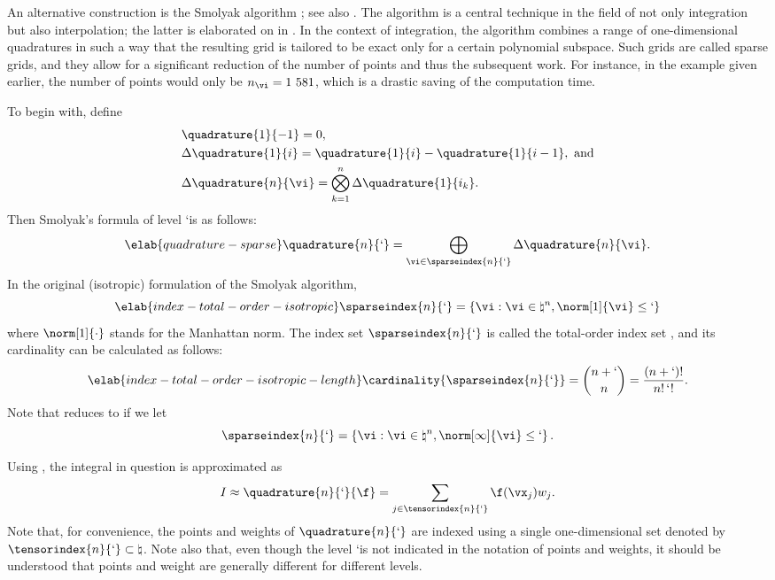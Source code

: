 An alternative construction is the Smolyak algorithm \cite{smolyak1963}; see
also \cite{klimke2006, eldred2008, heiss2008, maitre2010}. The algorithm is a
central technique in the field of not only integration but also interpolation;
the latter is elaborated on in . In the context of
integration, the algorithm combines a range of one-dimensional quadratures in
such a way that the resulting grid is tailored to be exact only for a certain
polynomial subspace. Such grids are called sparse grids, and they allow for a
significant reduction of the number of points and thus the subsequent work. For
instance, in the example given earlier, the number of points would only be
$n_{\vi} = 1~581$, which is a drastic saving of the computation time.

To begin with, define
\begin{align*}
  & \quadrature{1}{-1} = 0, \\
  & \Delta\quadrature{1}{i} = \quadrature{1}{i} - \quadrature{1}{i - 1}, \text{ and} \\
  & \Delta\quadrature{n}{\vi} = \bigotimes_{k = 1}^n \Delta\quadrature{1}{i_k}.
\end{align*}
Then Smolyak's formula of level \lq is as follows:
\begin{equation} \elab{quadrature-sparse}
  \quadrature{n}{\lq} = \bigoplus_{\vi \in \sparseindex{n}{\lq}} \Delta\quadrature{n}{\vi}.
\end{equation}
In the original (isotropic) formulation of the Smolyak algorithm,
\begin{equation} \elab{index-total-order-isotropic}
  \sparseindex{n}{\lq} = \left\{ \vi: \vi \in \natural^n, \norm[1]{\vi} \leq \lq \right\}
\end{equation}
where $\norm[1]{\cdot}$ stands for the Manhattan norm. The index set
$\sparseindex{n}{\lq}$ is called the total-order index set \cite{eldred2008,
beck2011}, and its cardinality can be calculated as follows:
\begin{equation} \elab{index-total-order-isotropic-length}
  \cardinality{\sparseindex{n}{\lq}} = {n + \lq \choose n} = \frac{(n + \lq)!}{n! \, \lq!}.
\end{equation}
Note that  reduces to  if we let
\[
  \sparseindex{n}{\lq} = \left\{ \vi: \vi \in \natural^n, \norm[\infty]{\vi} \leq \lq \right\}.
\]

Using , the integral in question is approximated as
\[
  I \approx \quadrature{n}{\lq}{\f}
  = \sum_{j \in \tensorindex{n}{\lq}} \f(\vx_j) w_j.
\]
Note that, for convenience, the points and weights of $\quadrature{n}{\lq}$ are
indexed using a single one-dimensional set denoted by $\tensorindex{n}{\lq}
\subset \natural$. Note also that, even though the level \lq is not indicated in
the notation of points and weights, it should be understood that points and
weight are generally different for different levels.

